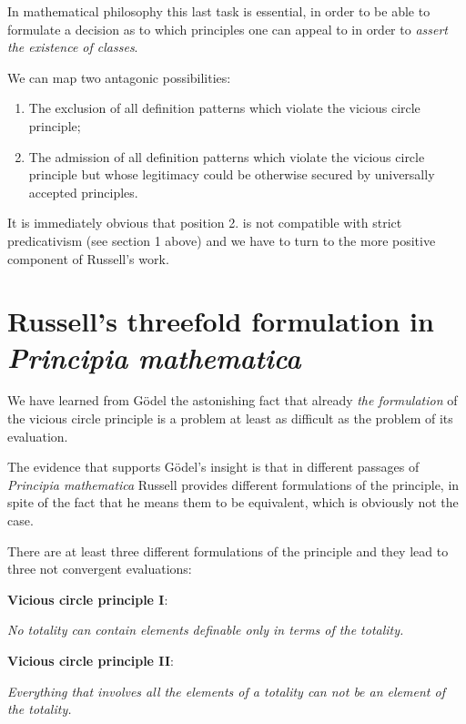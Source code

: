 \documentclass[12pt]{article}
\begin{document}
In mathematical philosophy this last task is essential, in order to be able to formulate a decision as to which principles one can appeal to in order to \emph{assert the existence of classes}.

We can map two antagonic possibilities:

\begin{enumerate}
\item The exclusion of all definition patterns which violate the vicious circle principle;

\item The admission of all definition patterns which violate the vicious circle principle but whose legitimacy could be otherwise secured by universally accepted principles.
\end{enumerate}

It is immediately obvious that position 2. is not compatible with strict predicativism (see section 1 above) and we have to turn to the more positive component of Russell's work.

\section{Russell's threefold formulation in \emph{Principia mathematica}}\normalsize

We have learned from G\"{o}del the astonishing fact that already \emph{the formulation} of the vicious circle principle is a problem at least as difficult as the problem of its evaluation.

The evidence that supports G\"{o}del's insight is that in different passages of \emph{Principia mathematica} Russell provides different formulations of the principle, in spite of the fact that he means them to be equivalent, which is obviously not the case.

There are at least three different formulations of the principle and they lead to three not convergent evaluations:

\quad \textbf{Vicious circle principle I}:
\begin{center}
\emph{No totality can contain elements definable only in terms of the totality.}
\end{center}

                       
\quad \textbf{Vicious circle principle II}:
\begin{center}
\emph{Everything that involves all the elements of a totality can not be an element of the totality.}
\end{center}
\end{document}
